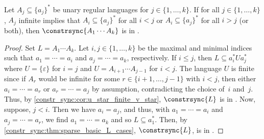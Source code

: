 \begin{corollary} \label{constr_sync:cor:letter-bounded-single-part-in-L}
	Let $A_j \subseteq \{a_j\}^*$ be unary regular languages
	for $j \in \{1,\ldots, k\}$.
	If for all $j \in \{1,\ldots, k\}$, $A_j$ infinite implies that $A_i \subseteq \{a_j\}^*$
	for all $i < j$ or $A_i \subseteq \{a_j\}^*$ for all $i > j$ (or both), then $\constrsync{ A_1 \cdots A_k }$
	is in \LOGSPACE.
\end{corollary}
\begin{proof}
	Set $L = A_1 \cdots A_k$.
	Let $i,j \in \{1,\ldots,k\}$ be the maximal and minimal indices
	such that $a_1 = \cdots = a_i$ and $a_j = \cdots = a_k$, respectively.
	If $i \le j$,
	then $L \subseteq a_i^* U a_j^*$
	where $U = \{\varepsilon\}$ for $i = j$ and $U = A_{i+1} \cdots A_{j-1}$ for $i < j$.
	The language $U$ is finite
	since if $A_r$ would be infinite for some $r \in \{i+1,\ldots,j-1\}$ with $i < j$,
	then either $a_i = \cdots = a_r$
	or $a_r = \cdots = a_j$ by assumption, contradicting the choice of~$i$ and~$j$.
	Thus, by \cref{constr_sync:cor:u_star_finite_v_star},
	$\constrsync{L}$
	is in \LOGSPACE.
	Now, suppose, $j < i$.
	Then we have $a_i = a_j$,
	and thus, with
	$a_1 = \cdots = a_i$
	and $a_j = \cdots = a_r$,
	we find $a_1 = \cdots = a_k$
	and so $L \subseteq a_1^*$.
	Then, by \cref{constr_sync:thm:sparse_basic_L_cases}, $\constrsync{L}$,
	is in \LOGSPACE.
\end{proof}